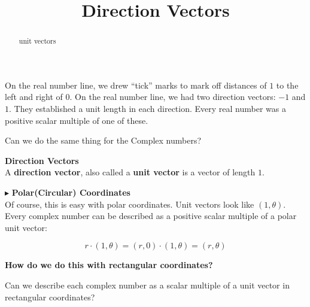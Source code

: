 \documentclass{ximera}
\title{Direction Vectors}
\begin{document}
\begin{abstract}
unit vectors
\end{abstract}
\maketitle




On the real number line, we drew ``tick'' marks to mark off distances of $1$ to the left and right of $0$. On the real number line, we had two direction vectors: $-1$ and $1$.  They established a unit length in each direction. Every real number was a positive scalar multiple of one of these.

Can we do the same thing for the Complex numbers? \\









\begin{definition}  \textbf{\textcolor{green!50!black}{Direction Vectors}}   \\

A \textbf{direction vector}, also called a \textbf{unit vector} is a vector of length $1$.

\end{definition}









$\blacktriangleright$ \textbf{\textcolor{blue!75!black}{Polar(Circular) Coordinates}}  \\


Of course, this is easy with polar coordinates.  Unit vectors look like $(1, \theta)$. \\

Every complex number can be described as a positive scalar multiple of a polar unit vector:  


\[
r \cdot (1, \theta) = (r, 0) \cdot (1, \theta) = (r, \theta)
\]



\begin{center}
\textbf{\textcolor{red!80!black}{How do we do this with rectangular coordinates?}}
\end{center}



Can we describe each complex number as a scalar multiple of a unit vector in rectangular coordinates? \\
\end{document}
